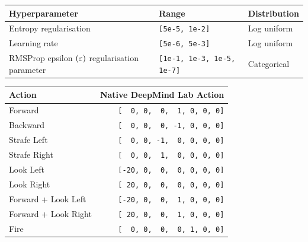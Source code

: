 \begin{center}
\begin{tabular}{l@{\hspace{.22cm}}l@{\hspace{.22cm}}l@{\hspace{.22cm}}}
    \toprule
    \textbf{Hyperparameter} & \textbf{Range} & \textbf{Distribution}  \\ \midrule
    Entropy regularisation & \texttt{[5e-5, 1e-2]} & Log uniform \\
    Learning rate & \texttt{[5e-6, 5e-3]} & Log uniform \\
    RMSProp epsilon $(\varepsilon)$ regularisation parameter  & \texttt{[1e-1, 1e-3, 1e-5, 1e-7]} & Categorical \\
    \bottomrule
\end{tabular}
\label{tab:hyperparameter_ranges}
\end{center}


\begin{center}
\begin{tabular}{l@{\hspace{.22cm}}r@{\hspace{.22cm}}}
\toprule
\textbf{Action} & \textbf{Native DeepMind Lab Action}  \\ \midrule
Forward & \texttt{[\ \ 0, 0,\ \ 0,\ \ 1, 0, 0, 0]} \\
Backward & \texttt{[\ \ 0, 0,\ \ 0, -1, 0, 0, 0]} \\
Strafe Left & \texttt{[\ \ 0, 0, -1,\ \ 0, 0, 0, 0]} \\
Strafe Right & \texttt{[\ \ 0, 0,\ \ 1,\ \ 0, 0, 0, 0]} \\
Look Left & \texttt{[-20, 0,\ \ 0,\ \ 0, 0, 0, 0]} \\
Look Right & \texttt{[ 20, 0,\ \ 0,\ \ 0, 0, 0, 0]} \\
Forward + Look Left & \texttt{[-20, 0,\ \ 0,\ \ 1, 0, 0, 0]} \\
Forward + Look Right & \texttt{[ 20, 0,\ \ 0,\ \ 1, 0, 0, 0]} \\
Fire & \texttt{[\ \ 0, 0,\ \ 0,\ \ 0, 1, 0, 0]} \\
      \bottomrule
\end{tabular}
\label{tab:action_sets}
\end{center}

